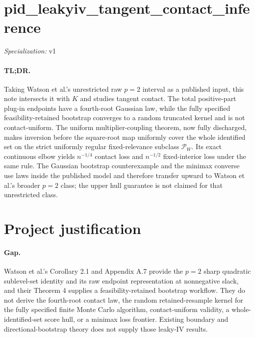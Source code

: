 \documentclass{article}
\begin{document}
\sloppy

\section*{pid\_\allowbreak{}leakyiv\_\allowbreak{}tangent\_\allowbreak{}contact\_\allowbreak{}inference}

\noindent\textit{Specialization:} v1\par

\paragraph{TL;DR.} Taking Watson et al.'s unrestricted raw \(p=2\) interval as a published input, this note intersects it with \(K\) and studies tangent contact. The total positive-part plug-in endpoints have a fourth-root Gaussian law, while the fully specified feasibility-retained bootstrap converges to a random truncated kernel and is not contact-uniform. The uniform multiplier-coupling theorem, now fully discharged, makes inversion before the square-root map uniformly cover the whole identified set on the strict uniformly regular fixed-relevance subclass \(\mathcal P_W\). Its exact continuous elbow yields \(n^{-1/4}\) contact loss and \(n^{-1/2}\) fixed-interior loss under the same rule. The Gaussian bootstrap counterexample and the minimax converse use laws inside the published model and therefore transfer upward to Watson et al.'s broader \(p=2\) class; the upper hull guarantee is not claimed for that unrestricted class.

\section{Project justification}

\paragraph{Gap.} Watson et al.'s Corollary 2.1 and Appendix A.7 provide the \(p=2\) sharp quadratic sublevel-set identity and its raw endpoint representation at nonnegative slack, and their Theorem 4 supplies a feasibility-retained bootstrap workflow. They do not derive the fourth-root contact law, the random retained-resample kernel for the fully specified finite Monte Carlo algorithm, contact-uniform validity, a whole-identified-set score hull, or a minimax loss frontier. Existing boundary and directional-bootstrap theory does not supply those leaky-IV results.
\end{document}
